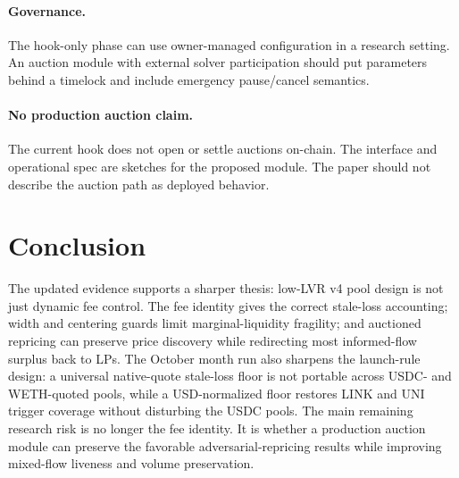 \documentclass[11pt]{article}
\begin{document}
\paragraph{Governance.}
The hook-only phase can use owner-managed configuration in a research setting. An auction module with external solver participation should put parameters behind a timelock and include emergency pause/cancel semantics.

\paragraph{No production auction claim.}
The current hook does not open or settle auctions on-chain. The interface and operational spec are sketches for the proposed module. The paper should not describe the auction path as deployed behavior.

\section{Conclusion}

The updated evidence supports a sharper thesis: low-LVR v4 pool design is not just dynamic fee control. The fee identity gives the correct stale-loss accounting; width and centering guards limit marginal-liquidity fragility; and auctioned repricing can preserve price discovery while redirecting most informed-flow surplus back to LPs. The October month run also sharpens the launch-rule design: a universal native-quote stale-loss floor is not portable across USDC- and WETH-quoted pools, while a USD-normalized floor restores LINK and UNI trigger coverage without disturbing the USDC pools. The main remaining research risk is no longer the fee identity. It is whether a production auction module can preserve the favorable adversarial-repricing results while improving mixed-flow liveness and volume preservation.
\end{document}
